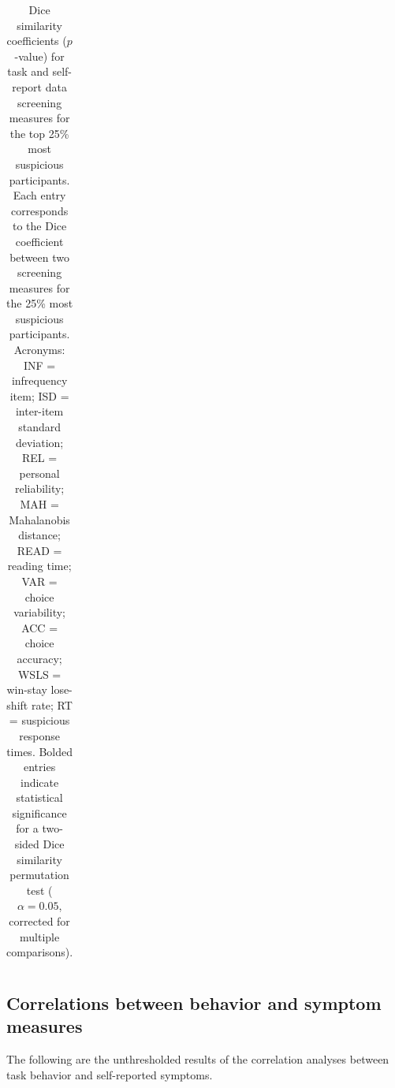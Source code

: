 \documentclass[a4paper,notitlepage,12pt]{article}
\begin{document}
\begin{refsection}[supp]
\begin{table}[H]
\begin{adjustbox}{center}
\begin{tabular}{rccccccccc}
        \bottomrule
    \end{tabular}
    \end{adjustbox}
    \caption{Dice similarity coefficients ($p$-value) for task and self-report data screening measures for the top 25\% most suspicious participants. Each entry corresponds to the Dice coefficient between two screening measures for the 25\% most suspicious participants. Acronyms: INF = infrequency item; ISD = inter-item standard deviation; REL = personal reliability; MAH = Mahalanobis distance; READ = reading time; VAR = choice variability; ACC = choice accuracy; WSLS = win-stay lose-shift rate; RT = suspicious response times. Bolded entries indicate statistical significance for a two-sided Dice similarity permutation test ($\alpha = 0.05$, corrected for multiple comparisons).}
\end{table}

\clearpage
\subsection*{Correlations between behavior and symptom measures}

The following are the unthresholded results of the correlation analyses between task behavior and self-reported symptoms.  


\end{refsection}
\end{document}

